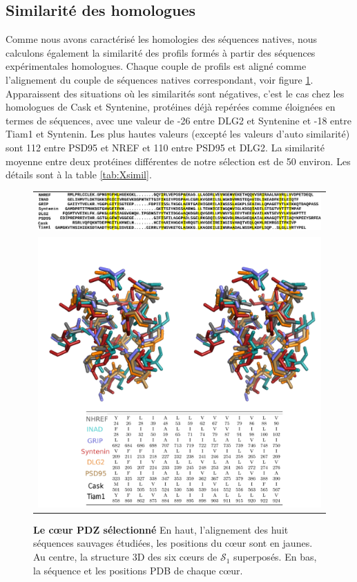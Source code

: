     \subsection{Similarité des homologues}

Comme nous avons caractérisé les homologies des séquences natives, nous calculons également la similarité des profils formés à partir des séquences expérimentales homologues. Chaque couple de profils est aligné comme l'alignement du couple de séquences natives correspondant, voir figure \ref{fig:corePDZ}. Apparaissent des situations où les similarités sont négatives, c'est le cas chez les homologues de Cask et Syntenine, protéines déjà repérées comme éloignées en termes de séquences, avec une valeur de -26 entre DLG2 et Syntenine et -18 entre Tiam1  et Syntenin. Les plus hautes valeurs (excepté les valeurs d'auto similarité) sont  112 entre PSD95 et NREF et 110 entre PSD95 et DLG2. La similarité moyenne entre deux protéines différentes de notre sélection est de 50 environ. Les détails sont à la table \ref{tab:Xsimil}. 
    
    \begin{figure}[!htbp]
     \centering
     \begin{tabular}{c}
       \includegraphics[width=18cm]{images/native_align.pdf} \\
       \includegraphics[width=16cm]{images/corePDZ2.png} \\
     \end{tabular}
     \caption{\textbf{Le cœur PDZ sélectionné} En haut, l'alignement des huit séquences sauvages étudiées, les positions du cœur sont en jaunes. Au centre, la structure 3D des six cœurs de $\mathcal{S}_1$ superposés. En bas, la séquence et les \og positions PDB \fg de chaque cœur.}
     \label{fig:corePDZ}      
    \end{figure}
    
